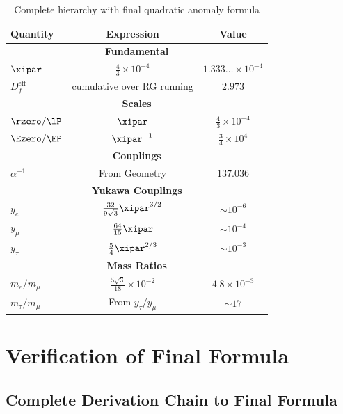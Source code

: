 	\begin{table}[h]
		\centering
		\begin{tabular}{lcc}
			\toprule
			\textbf{Quantity} & \textbf{Expression} & \textbf{Value} \\
			\midrule
			\multicolumn{3}{c}{\textbf{Fundamental}} \\
			$\xipar$ & $\frac{4}{3} \times 10^{-4}$ & $1.333\ldots \times 10^{-4}$ \\
			$D_f^{\text{eff}}$ & cumulative over RG running & $2.973$ \\
			\midrule
			\multicolumn{3}{c}{\textbf{Scales}} \\
			$\rzero/\lP$ & $\xipar$ & $\frac{4}{3} \times 10^{-4}$ \\
			$\Ezero/\EP$ & $\xipar^{-1}$ & $\frac{3}{4} \times 10^{4}$ \\
			\midrule
			\multicolumn{3}{c}{\textbf{Couplings}} \\
			$\alpha^{-1}$ & From Geometry & $137.036$ \\
			\midrule
			\multicolumn{3}{c}{\textbf{Yukawa Couplings}} \\
			$y_e$ & $\frac{32}{9\sqrt{3}} \xipar^{3/2}$ & $\sim 10^{-6}$ \\
			$y_\mu$ & $\frac{64}{15} \xipar$ & $\sim 10^{-4}$ \\
			$y_\tau$ & $\frac{5}{4} \xipar^{2/3}$ & $\sim 10^{-3}$ \\
			\midrule
			\multicolumn{3}{c}{\textbf{Mass Ratios}} \\
			$m_e/m_\mu$ & $\frac{5 \sqrt{3}}{18} \times 10^{-2}$ & $4.8 \times 10^{-3}$ \\
			$m_\tau/m_\mu$ & From $y_\tau/y_\mu$ & $\sim 17$ \\
			\midrule

		\end{tabular}
		\caption{Complete hierarchy with final quadratic anomaly formula}
	\end{table}
	
	\section{Verification of Final Formula}
	
	\subsection{Complete Derivation Chain to Final Formula}
	
